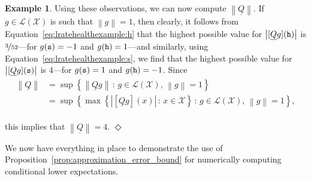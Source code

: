 \documentclass[10pt,a4paper]{paper}
\theoremstyle{definition}
\newtheorem{exmp}{Example}%
\newcommand{\states}{\mathcal{X}}
\newcommand{\gambles}{\mathcal{L}}
\newcommand{\gamblesX}{\gambles(\states)}
\newcommand{\rateset}{\mathcal{Q}}
\newcommand{\lrate}{\underline{Q}}
\newcommand{\norm}[1]{\left\lVert #1 \right\rVert}
\newcommand{\abs}[1]{\left\vert #1 \right\vert}
\newcommand{\exampleend}{\hfill$\Diamond$}
\begin{document}
\begin{exmp}

Using these observations, we can now compute $\norm{\lrate}$. If $g\in\gamblesX$ is such that $\norm{g}=1$, then clearly, it follows from Equation~\eqref{eq:lratehealthexample:h} that the highest possible value for $\abs{[\lrate g]({\tt h})}$ is $\nicefrac{3}{52}$---for $g({\tt s})=-1$ and $g({\tt h})=1$---and similarly, using Equation~\eqref{eq:lratehealthexample:s}, we find that the highest possible value for $\abs{[\lrate g]({\tt s})}$ is $4$---for $g({\tt s})=1$ and $g({\tt h})=-1$. Since
\vspace{-2pt}
\begin{align*}
\norm{\lrate} &= \sup\left\{ \norm{\lrate g}\,:\,g\in\gamblesX,\, \norm{g}=1 \right\} \\
 &= \sup\left\{ \max\left\{\abs{\left[\lrate g\right](x)}\,:\,x\in\states\right\}\,:\,g\in\gamblesX,\, \norm{g}=1 \right\},
\end{align*}\\[-4pt]
this implies that $\norm{\lrate}=4$.
\exampleend
\end{exmp}

We now have everything in place to demonstrate the use of Proposition~\ref{prop:approximation_error_bound} for numerically computing conditional lower expectations. %
\end{document}
